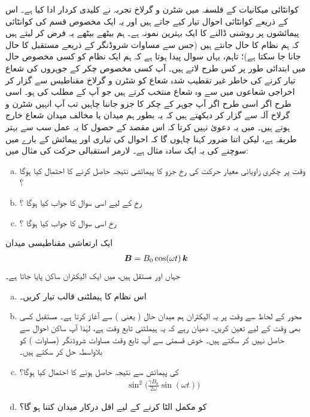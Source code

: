  کوانٹائی میکانیات کے فلسفہ میں شٹرن و گرلاخ تجربہ نے کلیدی کردار ادا کیا ہے۔ اس کے ذریعے کوانٹائی احوال تیار کیے جاتے ہیں اور یہ ایک مخصوص قسم کی کوانٹائی پیمائشوں پر روشنی ڈالنے کا ایک بہترین نمونہ ہے۔ ہم بیٹھے بیٹھے یہ فرض کر لیتے ہیں کہ ہم نظام کا  حال جانتے ہیں (جس سے مساوات شروڈنگر کے ذریعے مستقبل کا حال جانا جا سکتا ہے)؛ تاہم، یہاں سوال پیدا ہوتا ہے کہ ہم ایک نظام کو کسی مخصوص حال میں ابتدائی طور پر کس طرح لاتے ہیں۔ آپ کسی مخصوص چکر کے جوہروں کی شعاع تیار کرنے کی خاطر غیر تقطیب شدہ شعاع کو شٹرن و گرلاخ مقناطیس سے گزار کر اخراجی شعاعوں میں سے وہ شعاع منتخب کرتے ہیں جو آپ کے مطلب کی ہو۔ اسی طرح اگر اسی طرح اگر آپ جوہر کے چکر کا  جزو جاننا چاہیں تب آپ انہیں شٹرن و گرلاخ آلہ سے گزار کر دیکھتے ہیں کہ یہ بطور ہم میدان یا مخالف میدان شعاع خارج ہوتے ہیں۔ میں یہ دعویٰ نہیں کرتا کہ اس مقصد کے حصول کا یہ عمل سب سے بہتر طریقہ ہے، لیکن اتنا ضرور کہنا چاہوں گا کہ احوال کی تیاری اور پیمائش کے بارے میں سوچنے کی یہ ایک سادہ مثال ہے۔ 
لارمر استقبالی حرکت کی مثال  میں:
\begin{enumerate}[a.]
\item
وقت  پر چکری زاویائی معیار حرکت کی  رخ جزو کا پیمائشی نتیجہ  حاصل کرنے کا احتمال کیا ہوگا ؟
\item
{} رخ کے لیے اسی سوال کا جواب کیا ہوگا ؟
\item 
{} رخ اسی سوال کا جواب کیا ہوگا ؟
\end{enumerate}
ایک ارتعاشی مقناطیسی میدان 
\begin{align*}
{\ensuremath{{\boldsymbol{B}}}} = B_0 \cos(\omega t) \,{\boldsymbol{k}}
\end{align*}
جہاں  اور  مستقل ہیں، میں ایک الیکٹران ساکن پایا جاتا ہے۔
\begin{enumerate}[a.]
\item
اس نظام کا ہیملٹنی قالب تیار کریں۔
\item
محور  کے لحاظ سے وقت  پر یہ الیکٹران ہم میدان حال ( یعنی ) سے آغاز کرتا ہے۔ مستقبل کسی بھی وقت کے لیے  تعین کریں۔ دھیان رہے کہ یہ ہیملٹنی تابع وقت ہے، لہٰذا آپ ساکن احوال سے  حاصل نہیں کر سکتے ہیں۔ خوش قسمتی سے آپ تابع وقت مساوات شروڈنگر (مساوات ) کو بلاواسطہ حل کر سکتے ہیں۔ 
\item
{} کی پیمائش سے  نتیجہ حاصل ہونے کا احتمال کیا ہوگا؟  
\begin{align*}
\sin^2 \big ( \frac{\gamma B_0}{2 \omega} \sin(\omega t) \big )
\end{align*}
\item
{} کو مکمل الٹا کرنے کے لیے اقل درکار میدان  کتنا ہو گا؟ 
\end{enumerate}
